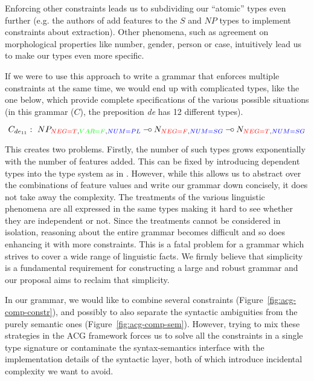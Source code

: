 \documentclass{llncs}
\def\limp {\mathbin{{-}\mkern-3.5mu{\circ}}}
\begin{document}
Enforcing other constraints leads us to subdividing our ``atomic'' types even
further (e.g. the authors of \cite{pogodalla2012controlling} add features to
the $S$ and $NP$ types to implement constraints about extraction). Other
phenomena, such as agreement on morphological properties like number, gender,
person or case, intuitively lead us to make our types even more specific.

If we were to use this approach to write a grammar that enforces multiple
constraints at the same time, we would end up with complicated types, like the
one below, which provide complete specifications of the various possible
situations (in this grammar ($C$), the preposition \emph{de} has 12 different
types).

\vspace{-4ex}

$$
C_{de_{11}} :\ NP_{\textcolor{red}{NEG{=}T}, \textcolor{green}{VAR{=}F}, \textcolor{blue}{NUM{=}PL}}
\limp N_{\textcolor{red}{NEG{=}F},\textcolor{blue}{NUM{=}SG}}
\limp N_{\textcolor{red}{NEG{=}T},\textcolor{blue}{NUM{=}SG}}
$$

\vspace{-1ex}

This creates two problems. Firstly, the number of such types grows
exponentially with the number of features added. This can be fixed by
introducing dependent types into the type system as in
\cite{de2007type}. However, while this allows us to abstract over the
combinations of feature values and write our grammar down concisely, it does
not take away the complexity. The treatments of the various linguistic
phenomena are all expressed in the same types making it hard to see whether
they are independent or not. Since the treatments cannot be considered in
isolation, reasoning about the entire grammar becomes difficult and so does
enhancing it with more constraints. This is a fatal problem for a grammar
which strives to cover a wide range of linguistic facts. We firmly believe
that simplicity is a fundamental requirement for constructing a large and
robust grammar and our proposal aims to reclaim that simplicity.

In our grammar, we would like to combine several constraints
(Figure~\ref{fig:acg-comp-constr}), and possibly to also separate the
syntactic ambiguities from the purely semantic ones
(Figure~\ref{fig:acg-comp-sem}).  However, trying to mix these strategies in
the ACG framework forces us to solve all the constraints in a single type
signature or contaminate the syntax-semantics interface with the
implementation details of the syntactic layer, both of which introduce
incidental complexity we want to avoid.
\end{document}

